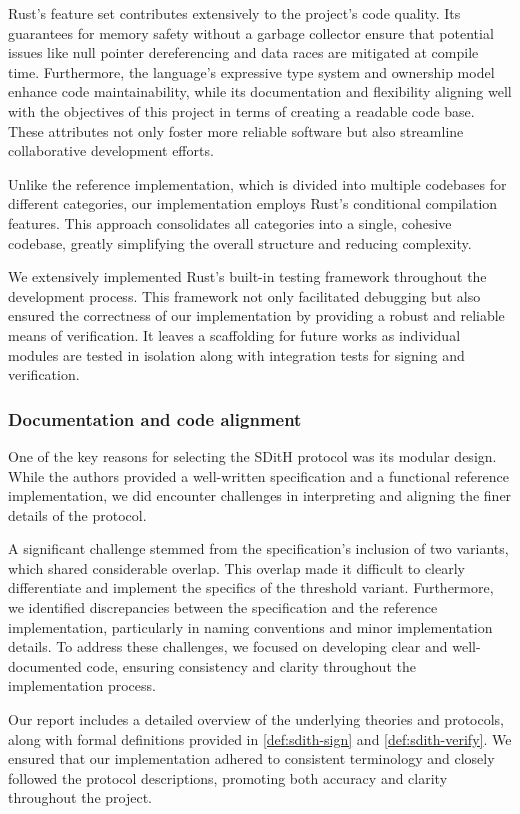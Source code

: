 \documentclass[11pt]{report}
\theoremstyle{definition}
\theoremstyle{plain}
\begin{document}
Rust's feature set contributes extensively to the project's code quality. Its guarantees for memory safety without a garbage collector ensure that potential issues like null pointer dereferencing and data races are mitigated at compile time. Furthermore, the language's expressive type system and ownership model enhance code maintainability, while its documentation and flexibility aligning well with the objectives of this project in terms of creating a readable code base. These attributes not only foster more reliable software but also streamline collaborative development efforts.

Unlike the reference implementation, which is divided into multiple codebases for different categories, our implementation employs Rust's conditional compilation features. This approach consolidates all categories into a single, cohesive codebase, greatly simplifying the overall structure and reducing complexity.

We extensively implemented Rust's built-in testing framework throughout the development process. This framework not only facilitated debugging but also ensured the correctness of our implementation by providing a robust and reliable means of verification. It leaves a scaffolding for future works as individual modules are tested in isolation along with integration tests for signing and verification.

\subsubsection{Documentation and code alignment}

One of the key reasons for selecting the SDitH protocol was its modular design. While the authors provided a well-written specification and a functional reference implementation, we did encounter challenges in interpreting and aligning the finer details of the protocol.

A significant challenge stemmed from the specification's inclusion of two variants, which shared considerable overlap. This overlap made it difficult to clearly differentiate and implement the specifics of the threshold variant. Furthermore, we identified discrepancies between the specification and the reference implementation, particularly in naming conventions and minor implementation details. To address these challenges, we focused on developing clear and well-documented code, ensuring consistency and clarity throughout the implementation process.

Our report includes a detailed overview of the underlying theories and protocols, along with formal definitions provided in \autoref{def:sdith-sign} and \autoref{def:sdith-verify}. We ensured that our implementation adhered to consistent terminology and closely followed the protocol descriptions, promoting both accuracy and clarity throughout the project.
\end{document}
